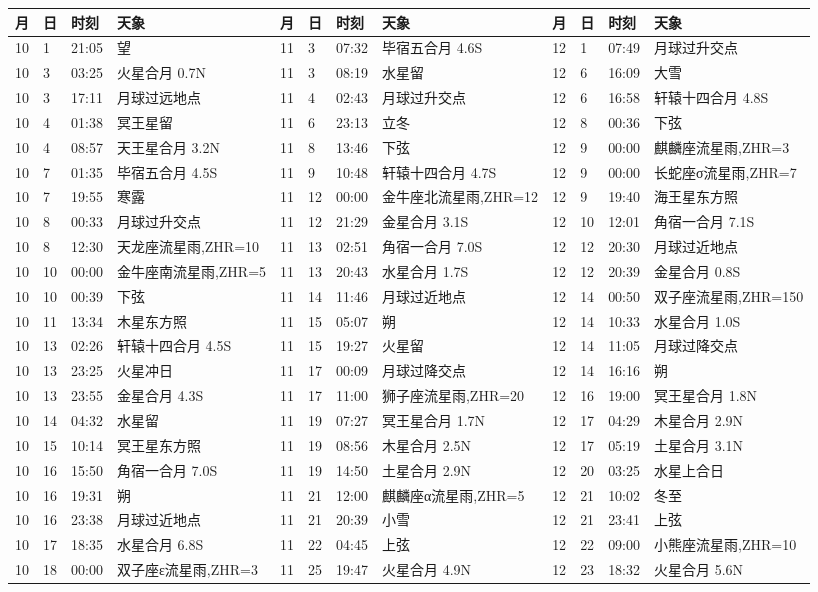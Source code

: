 \begin{tabular}{llll|llll|llll}
\hline
	月 & 日 & 时刻 & 天象 &         %
	月 & 日 & 时刻 & 天象 &
	月 & 日 & 时刻 & 天象 \tabularnewline
\hline
10 & 1 & 21:05 & 望 & 11 & 3 & 07:32 & 毕宿五合月 4.6S & 12 & 1 & 07:49 & 月球过升交点 \tabularnewline
10 & 3 & 03:25 & 火星合月 0.7N & 11 & 3 & 08:19 & 水星留 & 12 & 6 & 16:09 & 大雪 \tabularnewline
10 & 3 & 17:11 & 月球过远地点 & 11 & 4 & 02:43 & 月球过升交点 & 12 & 6 & 16:58 & 轩辕十四合月 4.8S \tabularnewline
10 & 4 & 01:38 & 冥王星留 & 11 & 6 & 23:13 & 立冬 & 12 & 8 & 00:36 & 下弦 \tabularnewline
10 & 4 & 08:57 & 天王星合月 3.2N & 11 & 8 & 13:46 & 下弦 & 12 & 9 & 00:00 & 麒麟座流星雨,ZHR=3 \tabularnewline
10 & 7 & 01:35 & 毕宿五合月 4.5S & 11 & 9 & 10:48 & 轩辕十四合月 4.7S & 12 & 9 & 00:00 & 长蛇座σ流星雨,ZHR=7 \tabularnewline
10 & 7 & 19:55 & 寒露 & 11 & 12 & 00:00 & 金牛座北流星雨,ZHR=12 & 12 & 9 & 19:40 & 海王星东方照 \tabularnewline
10 & 8 & 00:33 & 月球过升交点 & 11 & 12 & 21:29 & 金星合月 3.1S & 12 & 10 & 12:01 & 角宿一合月 7.1S \tabularnewline
10 & 8 & 12:30 & 天龙座流星雨,ZHR=10 & 11 & 13 & 02:51 & 角宿一合月 7.0S & 12 & 12 & 20:30 & 月球过近地点 \tabularnewline
10 & 10 & 00:00 & 金牛座南流星雨,ZHR=5 & 11 & 13 & 20:43 & 水星合月 1.7S & 12 & 12 & 20:39 & 金星合月 0.8S \tabularnewline
10 & 10 & 00:39 & 下弦 & 11 & 14 & 11:46 & 月球过近地点 & 12 & 14 & 00:50 & 双子座流星雨,ZHR=150 \tabularnewline
10 & 11 & 13:34 & 木星东方照 & 11 & 15 & 05:07 & 朔 & 12 & 14 & 10:33 & 水星合月 1.0S \tabularnewline
10 & 13 & 02:26 & 轩辕十四合月 4.5S & 11 & 15 & 19:27 & 火星留 & 12 & 14 & 11:05 & 月球过降交点 \tabularnewline
10 & 13 & 23:25 & 火星冲日 & 11 & 17 & 00:09 & 月球过降交点 & 12 & 14 & 16:16 & 朔 \tabularnewline
10 & 13 & 23:55 & 金星合月 4.3S & 11 & 17 & 11:00 & 狮子座流星雨,ZHR=20 & 12 & 16 & 19:00 & 冥王星合月 1.8N \tabularnewline
10 & 14 & 04:32 & 水星留 & 11 & 19 & 07:27 & 冥王星合月 1.7N & 12 & 17 & 04:29 & 木星合月 2.9N \tabularnewline
10 & 15 & 10:14 & 冥王星东方照 & 11 & 19 & 08:56 & 木星合月 2.5N & 12 & 17 & 05:19 & 土星合月 3.1N \tabularnewline
10 & 16 & 15:50 & 角宿一合月 7.0S & 11 & 19 & 14:50 & 土星合月 2.9N & 12 & 20 & 03:25 & 水星上合日 \tabularnewline
10 & 16 & 19:31 & 朔 & 11 & 21 & 12:00 & 麒麟座α流星雨,ZHR=5 & 12 & 21 & 10:02 & 冬至 \tabularnewline
10 & 16 & 23:38 & 月球过近地点 & 11 & 21 & 20:39 & 小雪 & 12 & 21 & 23:41 & 上弦 \tabularnewline
10 & 17 & 18:35 & 水星合月 6.8S & 11 & 22 & 04:45 & 上弦 & 12 & 22 & 09:00 & 小熊座流星雨,ZHR=10 \tabularnewline
10 & 18 & 00:00 & 双子座ε流星雨,ZHR=3 & 11 & 25 & 19:47 & 火星合月 4.9N & 12 & 23 & 18:32 & 火星合月 5.6N \tabularnewline

\end{tabular}
